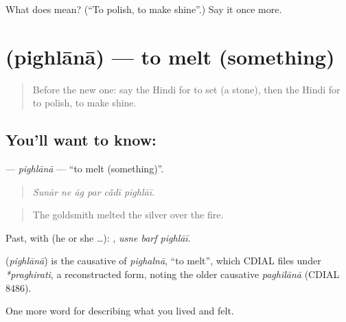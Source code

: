 \begin{tcolorbox}[breakable,colback=teal!4,colframe=teal!35!black,title={Before you move on}]
What does  mean? (\textquotedblleft{}To polish, to make shine\textquotedblright{}.) Say it once more.
\end{tcolorbox}
\section[\texorpdfstring{\hi{पिघलाना} (pighlānā)}{पिघलाना (pighlānā)}]{ (pighlānā) — to melt (something)}

\label{lesson:HI-C514-pighlana}



\begin{quote}
Before the new one: say the Hindi for to set (a stone), then the Hindi for to polish, to make shine.
\end{quote}

\subsection*{You'll want to know: }
\textbf{} — \emph{pighlānā} — \textquotedblleft{}to melt (something)\textquotedblright{}.

\begin{quote}
     
\end{quote}

\begin{quote}
\emph{Sunār ne āg par cā̃dī pighlāī.}
\end{quote}

\begin{quote}
The goldsmith melted the silver over the fire.
\end{quote}

Past, with  (he or she …):   , \emph{usne barf pighlāī}.

\begin{cousinweb}
\textbf{} (\emph{pighlānā}) is the causative of \emph{pighalnā}, \textquotedblleft{}to melt\textquotedblright{}, which CDIAL files under \emph{*praghirati}, a reconstructed form, noting the older causative \emph{paghilānā} (CDIAL 8486).
\end{cousinweb}

\begin{grammarlens}[title={What you've built}]
One more word for describing what you lived and felt.
\end{grammarlens}

